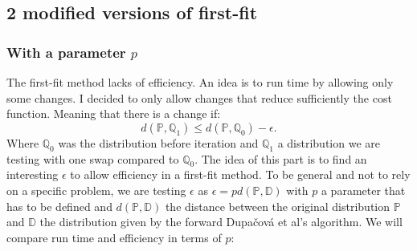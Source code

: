 \documentclass{amsart}
\begin{document}
\subsection{2 modified versions of first-fit}
\subsubsection{With a parameter $p$}
The first-fit method lacks of efficiency. An idea is to run time by allowing only some changes. I decided to only allow changes that reduce sufficiently the cost function. Meaning that there is a change if: $$
d\left(\mathbb{P},\mathbb{Q}_1\right) \leq d\left(\mathbb{P},\mathbb{Q}_0\right) - \epsilon.
$$
Where $\mathbb{Q}_0$ was the distribution before iteration and $\mathbb{Q}_1$ a distribution we are testing with one swap compared to $\mathbb{Q}_0$. The idea of this part is to find an interesting $\epsilon$ to allow efficiency in a first-fit method. To be general and not to rely on a specific problem, we are testing $\epsilon$ as $\epsilon=pd\left(\mathbb{P},\mathbb{D}\right)$ with $p$ a parameter that has to be defined and $d\left(\mathbb{P},\mathbb{D}\right)$ the distance between the original distribution $\mathbb{P}$ and $\mathbb{D}$ the distribution given by the forward Dupačová et al's algorithm. We will compare run time and efficiency in terms of $p$:
\end{document}
